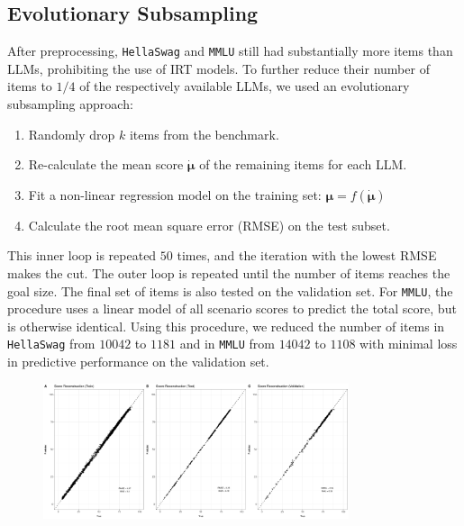 \documentclass{article}
\begin{document}
\subsection{Evolutionary Subsampling}
After preprocessing, \texttt{HellaSwag} and \texttt{MMLU} still had substantially more items than LLMs, prohibiting the use of IRT models. To further reduce their number of items to $1/4$ of the respectively available LLMs, we used an evolutionary subsampling approach:
\begin{enumerate}
   \item Randomly drop $k$ items from the benchmark.
   \item Re-calculate the mean score $\dot {\boldsymbol{\mu}}$ of the remaining items for each LLM.
   \item Fit a non-linear regression model on the training set: $\boldsymbol\mu = f(\dot{\boldsymbol\mu})$ 
   \item Calculate the root mean square error (RMSE) on the test subset.
\end{enumerate}
This inner loop is repeated $50$ times, and the iteration with the lowest RMSE makes the cut. The outer loop is repeated until the number of items reaches the goal size. The final set of items is also tested on the validation set. For \texttt{MMLU}, the procedure uses a linear model of all scenario scores to predict the total score, but is otherwise identical.
Using this procedure, we reduced the number of items in \texttt{HellaSwag} from $10042$ to $1181$ and in \texttt{MMLU} from $14042$ to $1108$ with minimal loss in predictive performance on the validation set.
\begin{figure}[h]
   \centering
   \includegraphics[width=0.8\textwidth]{figures/hellaswag-reduced.png}
   \caption{}
   \label{fig:hs-reduced}
\end{figure}

%
\end{document}
